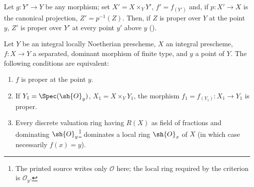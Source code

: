 Let $g:Y'\to Y$ be any morphism; set $X'=X\times_Y Y'$, $f'=f_{(Y')}$ and, if $p:X'\to X$ is the canonical projection, $Z'=p^{-1}(Z)$.
Then, if $Z$ is proper over $Y$ at the point $y$, $Z'$ is proper over $Y'$ at every point $y'$ above $y$ ().

\begin{proposition}[15.7.2]
\label{IV.15.7.2}
Let $Y$ be an integral locally Noetherian prescheme, $X$ an integral prescheme, $f:X\to Y$ a separated, dominant morphism of finite type, and $y$ a point of $Y$.
The following conditions are equivalent:
\begin{enumerate}[label=\emph{\alph*)}]
  \item $f$ is proper at the point $y$.
  \item If $Y_1=\Spec(\sh{O}_y)$, $X_1=X\times_Y Y_1$, the morphism $f_1=f_{(Y_1)}:X_1\to Y_1$ is proper.
  \item Every discrete valuation ring having $R(X)$ as field of fractions and dominating $\sh{O}_y$\footnote{The printed source writes only $\mathcal O$ here; the local ring required by the criterion is $\mathcal O_y$.} dominates a local ring $\sh{O}_x$ of $X$ (in which case necessarily $f(x)=y$).
\end{enumerate}
\end{proposition}

